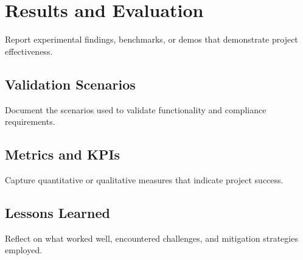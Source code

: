 \section{Results and Evaluation}

Report experimental findings, benchmarks, or demos that demonstrate project effectiveness.

\subsection{Validation Scenarios}
Document the scenarios used to validate functionality and compliance requirements.

\subsection{Metrics and KPIs}
Capture quantitative or qualitative measures that indicate project success.

\subsection{Lessons Learned}
Reflect on what worked well, encountered challenges, and mitigation strategies employed.
